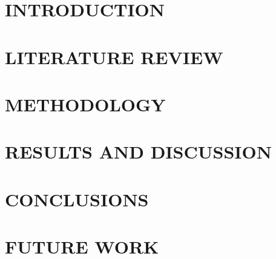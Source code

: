 \documentclass[12pt,twoside]{article}
\begin{document}
\cleardoublepage

\renewcommand{\contentsname}{TABLE OF CONTENTS}
\tableofcontents
\pagebreak
\listoffigures
\listoftables
\cleardoublepage
{}

\section{INTRODUCTION}

\cleardoublepage

\section{LITERATURE REVIEW}

\cleardoublepage

\section{METHODOLOGY}

\cleardoublepage

\section{RESULTS AND DISCUSSION}

\cleardoublepage

\section{CONCLUSIONS}
\cleardoublepage

\section{FUTURE WORK}

\cleardoublepage

\printbibliography[title={REFERENCES},heading=bibnumbered]
\cleardoublepage

\appendix

\cleardoublepage

\end{document}
